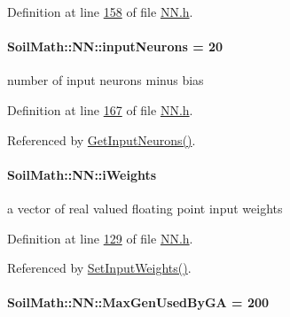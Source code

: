 Definition at line \hyperlink{_n_n_8h_source_l00158}{158} of file \hyperlink{_n_n_8h_source}{N\+N.\+h}.

\hypertarget{class_soil_math_1_1_n_n_a51723ae01e9b0a95c9aa6ac4f4c569fc}{}
\paragraph[{input\+Neurons}]{ Soil\+Math\+::\+N\+N\+::input\+Neurons = 20\hspace{0.3cm}{\ttfamily [private]}}\label{class_soil_math_1_1_n_n_a51723ae01e9b0a95c9aa6ac4f4c569fc}
number of input neurons minus bias 

Definition at line \hyperlink{_n_n_8h_source_l00167}{167} of file \hyperlink{_n_n_8h_source}{N\+N.\+h}.



Referenced by \hyperlink{_n_n_8h_source_l00140}{Get\+Input\+Neurons()}.

\hypertarget{class_soil_math_1_1_n_n_a96b0fe3caeed3d285204a6b4506075c9}{}
\paragraph[{i\+Weights}]{ Soil\+Math\+::\+N\+N\+::i\+Weights}\label{class_soil_math_1_1_n_n_a96b0fe3caeed3d285204a6b4506075c9}
a vector of real valued floating point input weights 

Definition at line \hyperlink{_n_n_8h_source_l00129}{129} of file \hyperlink{_n_n_8h_source}{N\+N.\+h}.



Referenced by \hyperlink{_n_n_8h_source_l00089}{Set\+Input\+Weights()}.

\hypertarget{class_soil_math_1_1_n_n_a360b26e66639b4eed186a62cdbac37e0}{}
\paragraph[{Max\+Gen\+Used\+By\+G\+A}]{ Soil\+Math\+::\+N\+N\+::\+Max\+Gen\+Used\+By\+G\+A = 200}\label{class_soil_math_1_1_n_n_a360b26e66639b4eed186a62cdbac37e0}


